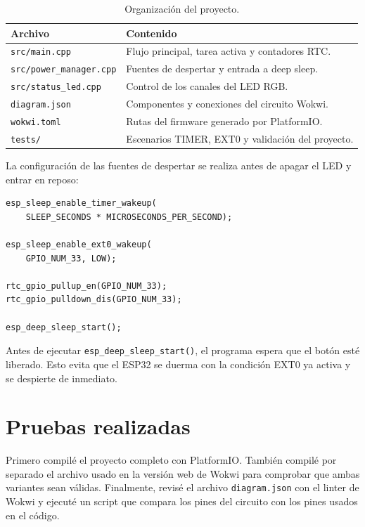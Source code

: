 \documentclass{article}
\newcommand{\tableheader}[1]{\color{tablewhite}\textbf{#1}}
\begin{document}
\begin{table}[H]
\centering
\renewcommand{\arraystretch}{1.25}
\begin{tabularx}{\linewidth}{|p{5cm}|Y|}
\hline
{}\tableheader{Archivo} & \tableheader{Contenido} \\
\hline
\texttt{src/main.cpp} & Flujo principal, tarea activa y contadores RTC. \\
\hline
\texttt{src/power\_manager.cpp} & Fuentes de despertar y entrada a deep sleep. \\
\hline
\texttt{src/status\_led.cpp} & Control de los canales del LED RGB. \\
\hline
\texttt{diagram.json} & Componentes y conexiones del circuito Wokwi. \\
\hline
\texttt{wokwi.toml} & Rutas del firmware generado por PlatformIO. \\
\hline
\texttt{tests/} & Escenarios TIMER, EXT0 y validación del proyecto. \\
\hline
\end{tabularx}
\caption{Organización del proyecto.}
\end{table}

La configuración de las fuentes de despertar se realiza antes de apagar el LED y entrar en reposo:

\begin{lstlisting}
esp_sleep_enable_timer_wakeup(
    SLEEP_SECONDS * MICROSECONDS_PER_SECOND);

esp_sleep_enable_ext0_wakeup(
    GPIO_NUM_33, LOW);

rtc_gpio_pullup_en(GPIO_NUM_33);
rtc_gpio_pulldown_dis(GPIO_NUM_33);

esp_deep_sleep_start();
\end{lstlisting}

Antes de ejecutar \texttt{esp\_deep\_sleep\_start()}, el programa espera que el botón esté liberado. Esto evita que el ESP32 se duerma con la condición EXT0 ya activa y se despierte de inmediato.

\section{Pruebas realizadas}

Primero compilé el proyecto completo con PlatformIO. También compilé por separado el archivo usado en la versión web de Wokwi para comprobar que ambas variantes sean válidas. Finalmente, revisé el archivo \texttt{diagram.json} con el linter de Wokwi y ejecuté un script que compara los pines del circuito con los pines usados en el código.
\end{document}

